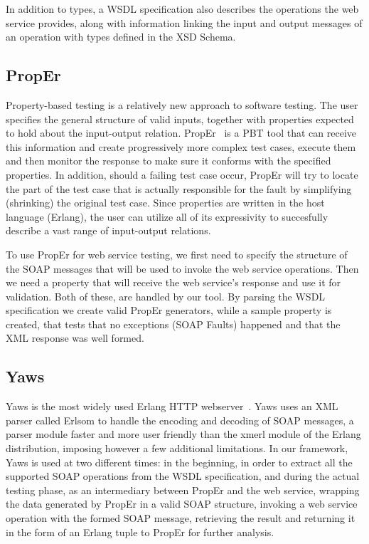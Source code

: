 \documentclass[submission,copyright]{eptcs}
\begin{document}
In addition to types, a WSDL specification also describes the operations the 
web service provides, along with information linking the input and output 
messages of an operation with types defined in the XSD Schema. 

\subsection{PropEr}

Property-based testing is a relatively new approach to software
testing. The user specifies the general structure of valid inputs,
together with properties expected to hold about the input-output
relation. PropEr~\cite{proper_tool} is a PBT tool that can receive
this information and create progressively more complex test cases,
execute them and then monitor the response to make sure it conforms
with the specified properties. In addition, should a failing test case
occur, PropEr will try to locate the part of the test case that is
actually responsible for the fault by simplifying (shrinking) the
original test case. Since properties are written in the host language
(Erlang), the user can utilize all of its expressivity to succesfully
describe a vast range of input-output relations.

To use PropEr for web service testing, we first need to specify the structure
of the SOAP messages that will be used to invoke the web service operations. 
Then we need a property that will receive the web service's response and use 
it for validation. Both of these, are handled by our tool. By parsing the 
WSDL specification we create valid PropEr generators, while a sample property
is created, that tests that no exceptions (SOAP Faults) happened and that the 
XML response was well formed.


\subsection{Yaws}

Yaws is the most widely used Erlang HTTP webserver~\cite{yaws}. Yaws
uses an XML parser called Erlsom to handle the encoding and decoding
of SOAP messages, a parser module faster and more user friendly than
the xmerl module of the Erlang distribution, imposing however a few
additional limitations. In our framework, Yaws is used at two
different times: in the beginning, in order to extract all the
supported SOAP operations from the WSDL specification, and during the
actual testing phase, as an intermediary between PropEr and the web
service, wrapping the data generated by PropEr in a valid SOAP
structure, invoking a web service operation with the formed SOAP
message, retrieving the result and returning it in the form of an
Erlang tuple to PropEr for further analysis.
\end{document}
